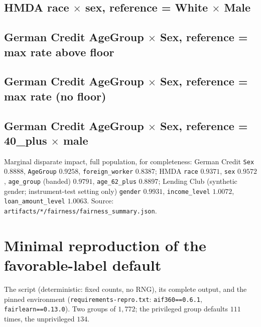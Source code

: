 \documentclass[sigconf,nonacm]{acmart}
\begin{document}
\subsection*{HMDA race $\times$ sex, reference = White $\times$ Male}
{\small}

\subsection*{German Credit AgeGroup $\times$ Sex, reference = max rate above floor}
{\small}

\subsection*{German Credit AgeGroup $\times$ Sex, reference = max rate (no floor)}
{\small}

\subsection*{German Credit AgeGroup $\times$ Sex, reference = 40\_plus $\times$ male}
{\small}

\medskip\noindent Marginal disparate impact, full population, for
completeness: German Credit \texttt{Sex} $0.8888$, \texttt{AgeGroup} $0.9258$,
\texttt{foreign\_worker} $0.8387$; HMDA \texttt{race} $0.9371$, \texttt{sex}
$0.9572$, \texttt{age\_group} (banded) $0.9791$, \texttt{age\_62\_plus}
$0.8897$; Lending Club (synthetic gender; instrument-test setting only)
\texttt{gender} $0.9931$, \texttt{income\_level} $1.0072$,
\texttt{loan\_amount\_level} $1.0063$. Source:
\texttt{artifacts/*/fairness/fairness\_summary.json}.

\section{Minimal reproduction of the favorable-label default}
\label{app:repro}

The script (deterministic: fixed counts, no RNG), its complete output, and
the pinned environment (\texttt{requirements-repro.txt}: \texttt{aif360==0.6.1},
\texttt{fairlearn==0.13.0}). Two groups of $1{,}772$; the privileged group
defaults $111$ times, the unprivileged $134$.

{\scriptsize}
\end{document}
